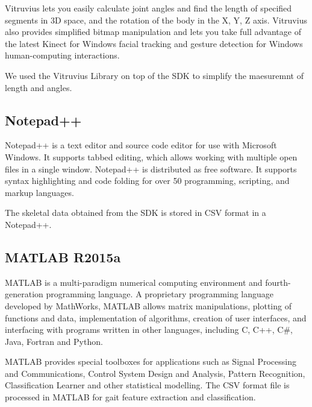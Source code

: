 \noindent Vitruvius lets you easily calculate joint angles and find the length of specified segments in 3D space, and the rotation of the body in the X, Y, Z axis.
Vitruvius also provides simplified bitmap manipulation and lets you take full advantage of the latest Kinect for Windows facial tracking and gesture detection for Windows human-computing interactions.
 
\noindent We used the Vitruvius Library on top of the SDK to simplify the maesuremnt of length and angles.

\subsection{Notepad++ }\label{Notepad++ } 
\noindent Notepad++ is a text editor and source code editor for use with Microsoft Windows. It supports tabbed editing, which allows working with multiple open files in a single window. Notepad++ is distributed as free software. It supports syntax highlighting and code folding for over 50 programming, scripting, and markup languages.

\noindent The skeletal data obtained from the SDK is stored in CSV format in a Notepad++.

\subsection{MATLAB R2015a }\label{MATLAB R2015a }
\noindent MATLAB is a multi-paradigm numerical computing environment and fourth-generation programming language. A proprietary programming language developed by MathWorks, MATLAB allows matrix manipulations, plotting of functions and data, implementation of algorithms, creation of user interfaces, and interfacing with programs written in other languages, including C, C++, C\#, Java, Fortran and Python.

\noindent MATLAB provides special toolboxes for applications such as Signal Processing and Communications, Control System Design and Analysis, Pattern Recognition, Classification Learner and other statistical modelling. The CSV format file is processed in MATLAB for gait feature extraction and classification. 

\newpage
